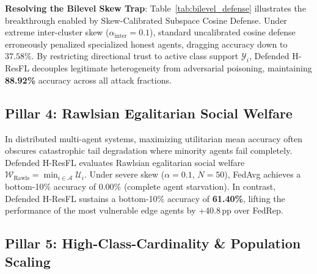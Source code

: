 \documentclass[sigconf]{acmart}
\begin{document}
\begin{table}[t]
\centering
\caption{\textbf{Resolution of Bilevel Dirichlet Skew False Penalization ($\alpha_{\text{inter}}=0.1, \alpha_{\text{intra}}=1.0$).}}
\label{tab:bilevel_defense}
\vspace{1.5mm}
\end{table}

\textbf{Resolving the Bilevel Skew Trap}: Table~\ref{tab:bilevel_defense} illustrates the breakthrough enabled by Skew-Calibrated Subspace Cosine Defense. Under extreme inter-cluster skew ($\alpha_{\text{inter}}=0.1$), standard uncalibrated cosine defense erroneously penalized specialized honest agents, dragging accuracy down to $37.58\%$. By restricting directional trust to active class support $\mathcal{Y}_i$, Defended H-ResFL decouples legitimate heterogeneity from adversarial poisoning, maintaining \textbf{88.92\%} accuracy across all attack fractions.

\subsection{Pillar 4: Rawlsian Egalitarian Social Welfare}
In distributed multi-agent systems, maximizing utilitarian mean accuracy often obscures catastrophic tail degradation where minority agents fail completely. Defended H-ResFL evaluates Rawlsian egalitarian social welfare $\mathcal{W}_{\text{Rawls}} = \min_{i \in \mathcal{A}} \mathcal{U}_i$. Under severe skew ($\alpha=0.1$, $N=50$), FedAvg achieves a bottom-10\% accuracy of $0.00\%$ (complete agent starvation). In contrast, Defended H-ResFL sustains a bottom-10\% accuracy of \textbf{61.40\%}, lifting the performance of the most vulnerable edge agents by +40.8\,pp over FedRep.

\subsection{Pillar 5: High-Class-Cardinality & Population Scaling}
\end{document}
